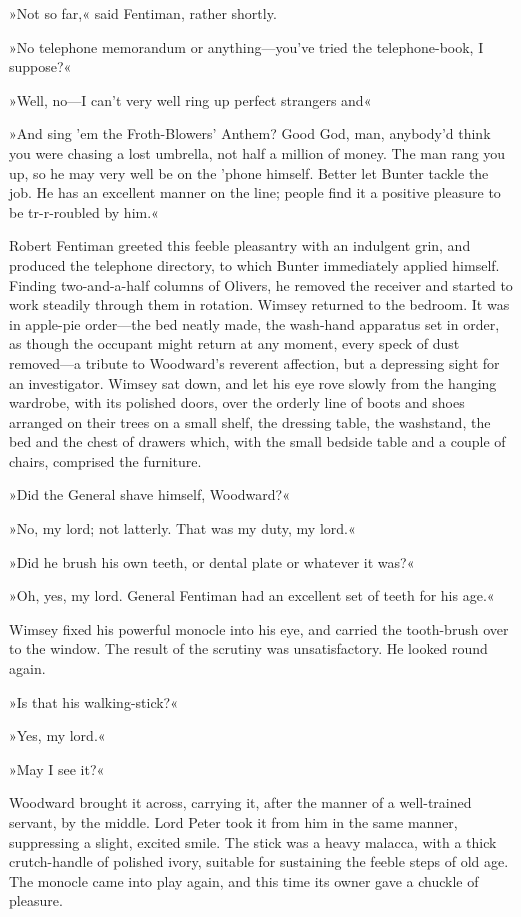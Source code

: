 »Not so far,« said Fentiman, rather shortly.

»No telephone memorandum or anything\allowbreak---\allowbreak you've tried the telephone-book, I suppose?«

»Well, no\allowbreak---\allowbreak I can't very well ring up perfect strangers and\longdash«

»And sing 'em the Froth-Blowers' Anthem? Good God, man, anybody'd think you were chasing a lost umbrella, not half a million of money. The man rang you up, so he may very well be on the 'phone himself. Better let Bunter tackle the job. He has an excellent manner on the line; people find it a positive pleasure to be tr-r-roubled by him.«

Robert Fentiman greeted this feeble pleasantry with an indulgent grin, and produced the telephone directory, to which Bunter immediately applied himself. Finding two-and-a-half columns of Olivers, he removed the receiver and started to work steadily through them in rotation. Wimsey returned to the bedroom. It was in apple-pie order\allowbreak---\allowbreak the bed neatly made, the wash-hand apparatus set in order, as though the occupant might return at any moment, every speck of dust removed\allowbreak---\allowbreak a tribute to Woodward's reverent affection, but a depressing sight for an investigator. Wimsey sat down, and let his eye rove slowly from the hanging wardrobe, with its polished doors, over the orderly line of boots and shoes arranged on their trees on a small shelf, the dressing table, the washstand, the bed and the chest of drawers which, with the small bedside table and a couple of chairs, comprised the furniture.

»Did the General shave himself, Woodward?«

»No, my lord; not latterly. That was my duty, my lord.«

»Did he brush his own teeth, or dental plate or whatever it was?«

»Oh, yes, my lord. General Fentiman had an excellent set of teeth for his age.«

Wimsey fixed his powerful monocle into his eye, and carried the tooth-brush over to the window. The result of the scrutiny was unsatisfactory. He looked round again.

»Is that his walking-stick?«

»Yes, my lord.«

»May I see it?«

Woodward brought it across, carrying it, after the manner of a well-trained servant, by the middle. Lord Peter took it from him in the same manner, suppressing a slight, excited smile. The stick was a heavy malacca, with a thick crutch-handle of polished ivory, suitable for sustaining the feeble steps of old age. The monocle came into play again, and this time its owner gave a chuckle of pleasure.

